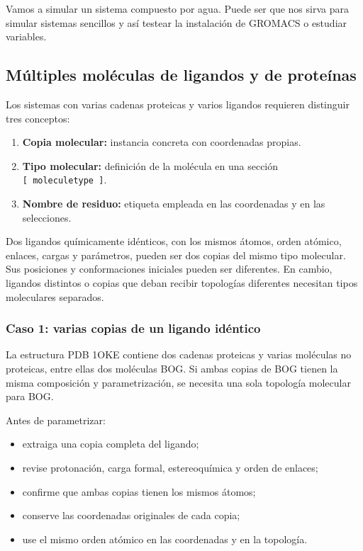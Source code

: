 \documentclass[
  spanish,
  11pt,
  a4paper]{article}
\providecommand{\tightlist}{%
  \setlength{\itemsep}{0pt}\setlength{\parskip}{0pt}}
\begin{document}
Vamos a simular un sistema compuesto por agua. Puede ser que nos sirva
para simular sistemas sencillos y así testear la instalación de GROMACS
o estudiar variables.

\subsection{Múltiples moléculas de ligandos y de
proteínas}\label{muxfaltiples-moluxe9culas-de-ligandos-y-de-proteuxednas}

Los sistemas con varias cadenas proteicas y varios ligandos requieren
distinguir tres conceptos:

\begin{enumerate}
\def\labelenumi{\arabic{enumi}.}
\tightlist
\item
  \textbf{Copia molecular:} instancia concreta con coordenadas propias.
\item
  \textbf{Tipo molecular:} definición de la molécula en una sección
  \texttt{{[}\ moleculetype\ {]}}.
\item
  \textbf{Nombre de residuo:} etiqueta empleada en las coordenadas y en
  las selecciones.
\end{enumerate}

Dos ligandos químicamente idénticos, con los mismos átomos, orden
atómico, enlaces, cargas y parámetros, pueden ser dos copias del mismo
tipo molecular. Sus posiciones y conformaciones iniciales pueden ser
diferentes. En cambio, ligandos distintos o copias que deban recibir
topologías diferentes necesitan tipos moleculares separados.

\subsubsection{Caso 1: varias copias de un ligando
idéntico}\label{caso-1-varias-copias-de-un-ligando-iduxe9ntico}

La estructura PDB 1OKE contiene dos cadenas proteicas y varias moléculas
no proteicas, entre ellas dos moléculas BOG. Si ambas copias de BOG
tienen la misma composición y parametrización, se necesita una sola
topología molecular para BOG.

Antes de parametrizar:

\begin{itemize}
\tightlist
\item
  extraiga una copia completa del ligando;
\item
  revise protonación, carga formal, estereoquímica y orden de enlaces;
\item
  confirme que ambas copias tienen los mismos átomos;
\item
  conserve las coordenadas originales de cada copia;
\item
  use el mismo orden atómico en las coordenadas y en la topología.
\end{itemize}
\end{document}
